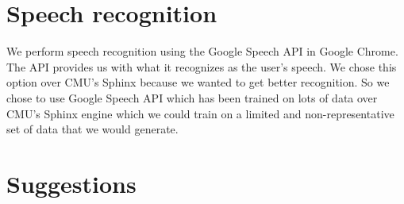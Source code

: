 \documentclass[]{article}
\begin{document}
\section{Speech recognition}
We perform speech recognition using the Google Speech API in Google Chrome. The 
API provides us with what it recognizes as the user's speech. We chose this 
option over CMU's Sphinx because we wanted to get better recognition. So we 
chose to use Google Speech API which has been trained on lots of data over 
CMU's Sphinx engine which we could train on a limited and non-representative 
set of data that we would generate.

\section{Suggestions}


\end{document}
